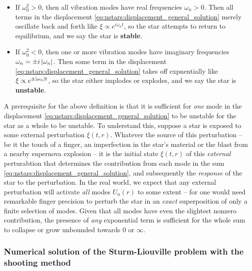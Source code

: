 \begin{itemize}
\item If $\omega_0^2 > 0$, then all vibration modes have real frequencies $\omega_n > 0$.
      Then all terms in the displacement \eqref{eq:nstars:displacement_general_solution} merely oscillate back and forth like $\xi \propto e^{i \omega_n t}$, so the star attempts to return to equilibrium, and we say the star is \textbf{stable}.
\item If $\omega_0^2 < 0$, then one or more vibration modes have imaginary frequencies $\omega_n = \pm i \left\lvert \omega_n \right\rvert$.
      Then some term in the displacement \eqref{eq:nstars:displacement_general_solution} takes off expnentially like $\xi \propto e^{\pm \left\lvert \omega_n \right\rvert t}$, so the star either implodes or explodes, and we say the star is \textbf{unstable}.
\end{itemize}
A prerequisite for the above definition is that it is sufficient for \emph{one} mode in the displacement \eqref{eq:nstars:displacement_general_solution} to be unstable for the star as a whole to be unstable.
To understand this, suppose a star is exposed to some external perturbation $\xi(t,r)$.
Whatever the source of this perturbation -- be it the touch of a finger, an imperfection in the star's material or the blast from a nearby supernova explosion -- it is the initial state $\xi(t,r)$ of this \emph{external} perturabtion that determines the contribution from each mode in the sum \eqref{eq:nstars:displacement_general_solution}, and subsequently the \emph{response} of the star to the perturbation.
In the real world, we expect that any external perturbation will activate \emph{all} modes $U_n(r)$ to some extent -- for one would need remarkable finger precision to perturb the star in an \emph{exact} superposition of only a finite selection of modes.
Given that all modes have even the slightest nonzero contribution, the presence of \emph{any} exponential term is sufficient for the whole sum to collapse or grow unbounded towards $0$ or $\infty$.




\subsubsection{Numerical solution of the Sturm-Liouville problem with the shooting method}

